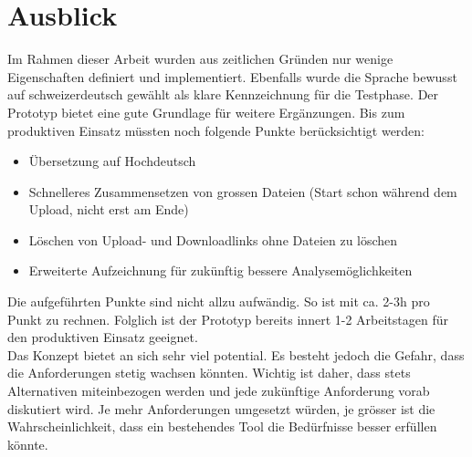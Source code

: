 \chapter{Ausblick}
Im Rahmen dieser Arbeit wurden aus zeitlichen Gründen nur wenige Eigenschaften definiert und implementiert.
Ebenfalls wurde die Sprache bewusst auf schweizerdeutsch gewählt als klare Kennzeichnung für die Testphase. 
Der Prototyp bietet eine gute Grundlage für weitere Ergänzungen. 
Bis zum produktiven Einsatz müssten noch folgende Punkte berücksichtigt werden:
\begin{itemize}
    \item Übersetzung auf Hochdeutsch
    \item Schnelleres Zusammensetzen von grossen Dateien (Start schon während dem Upload, nicht erst am Ende)
    \item Löschen von Upload- und Downloadlinks ohne Dateien zu löschen
    \item Erweiterte Aufzeichnung für zukünftig bessere Analysemöglichkeiten
\end{itemize}
Die aufgeführten Punkte sind nicht allzu aufwändig. So ist mit ca. 2-3h pro Punkt zu rechnen. 
Folglich ist der Prototyp bereits innert 1-2 Arbeitstagen für den produktiven Einsatz geeignet.
\\
Das Konzept bietet an sich sehr viel potential. 
Es besteht jedoch die Gefahr, dass die Anforderungen stetig wachsen könnten.
Wichtig ist daher, dass stets Alternativen miteinbezogen werden und jede zukünftige Anforderung vorab diskutiert wird.
Je mehr Anforderungen umgesetzt würden, je grösser ist die Wahrscheinlichkeit, 
dass ein bestehendes Tool die Bedürfnisse besser erfüllen könnte.

